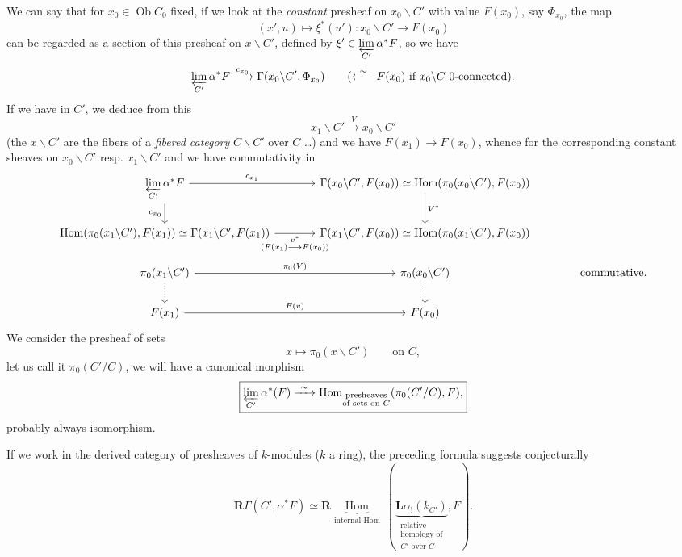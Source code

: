 \documentclass[11pt]{article}
\newcommand{\printedpage}[1]{\marginpar{\footnotesize p.~#1}}
\newcommand{\msp}[1]{\marginpar{\footnotesize [#1]}}
\begin{document}
We can say that for $x_0 \in \operatorname{Ob} C_0$ fixed, if we look at the \textit{constant} presheaf on $x_0\backslash C'$ with value $F(x_0)$, say $\Phi_{x_0}$, the map
\[ (x',u) \longmapsto \xi^*(u') : x_0\backslash C' \longrightarrow F(x_0) \]
can be regarded as a section of this presheaf on $x\backslash C'$, defined by $\xi' \in \varprojlim\limits_{C'} \alpha^*F$, so we have
\[ \varprojlim_{C'} \alpha^*F \xrightarrow{c_{x_0}} \Gamma(x_0\backslash C', \Phi_{x_0}) \qquad (\xleftarrow{\ \sim\ } F(x_0) \text{ if } x_0\backslash C \text{ 0-connected}). \]
If we have  in $C'$, we deduce from this
\[ x_1\backslash C' \xrightarrow{V} x_0\backslash C' \]
(the $x\backslash C'$ are the fibers of a \textit{fibered category} $C\backslash C'$ over $C$ \dots) and we have $F(x_1) \longrightarrow F(x_0)$, whence  for the corresponding constant sheaves on $x_0\backslash C'$ resp. $x_1\backslash C'$
\printedpage{5}
\msp{page 7}
and we have commutativity in
\[
\begin{tikzcd}[column sep=large]
\varprojlim\limits_{C'} \alpha^*F \arrow[r, "c_{x_1}"] \arrow[d, "c_{x_0}"'] & \Gamma(x_0\backslash C', F(x_0)) \simeq \operatorname{Hom}(\pi_0(x_0\backslash C'), F(x_0)) \arrow[d, "V^*"] & \\
\operatorname{Hom}(\pi_0(x_1\backslash C'), F(x_1)) \simeq \Gamma(x_1\backslash C', F(x_1)) \arrow[r, "\substack{v^*\\ (F(x_1) \longrightarrow F(x_0))}"'] & \Gamma(x_1\backslash C', F(x_0)) \simeq \operatorname{Hom}(\pi_0(x_1\backslash C'), F(x_0)) & \\
\pi_0(x_1\backslash C') \arrow[r, "\pi_0(V)"] \arrow[d, dotted] & \pi_0(x_0\backslash C') \arrow[d, dotted] & \text{commutative.} \\
F(x_1) \arrow[r, "F(v)"] & F(x_0) &
\end{tikzcd}
\]
We consider the presheaf of sets
\[ x \longmapsto \pi_0(x\backslash C') \qquad \text{on } C, \]
let us call it $\pi_0(C'/C)$, we will have a canonical morphism
\[ \boxed{\varprojlim_{C'} \alpha^*(F) \xrightarrow{\ \sim\ } \operatorname{Hom}_{\substack{\text{presheaves}\\ \text{of sets on $C$}}} (\pi_0(C'/C), F),} \]
probably always isomorphism.

If we work in the derived category of presheaves of $k$-modules ($k$ a ring), the preceding formula suggests conjecturally
\[ \boxed{\mathbf{R}\Gamma(C', \alpha^*F) \simeq \mathbf{R}\underbrace{\operatorname{Hom}}_{\text{internal Hom}}\ (\underbrace{\mathbf{L}\alpha_!(k_{C'})}_{\substack{\text{relative}\\ \text{homology of}\\ \text{$C'$ over $C$}}}, F).} \]
\end{document}
